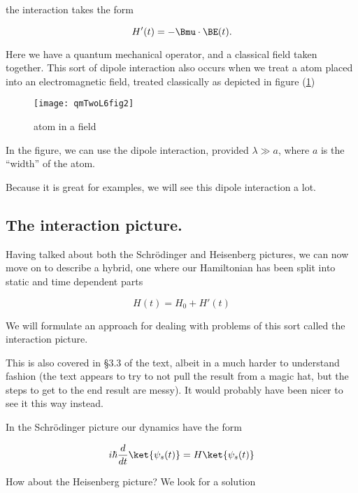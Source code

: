 the interaction takes the form

\begin{equation}\label{eqn:qmTwoL6:90}
H'(t) = -\Bmu \cdot \BE(t).
\end{equation}

Here we have a quantum mechanical operator, and a classical field taken together.  This sort of dipole interaction also occurs when we treat a atom placed into an electromagnetic field, treated classically as depicted in figure (\ref{fig:qmTwoL6fig2})

\begin{figure}[htp]
\centering
\texttt{[image: qmTwoL6fig2]}
\caption{atom in a field}\label{fig:qmTwoL6fig2}
\end{figure}

In the figure, we can use the dipole interaction, provided $\lambda \gg a$, where $a$ is the ``width'' of the atom.

Because it is great for examples, we will see this dipole interaction a lot.

\subsection{The interaction picture.}

Having talked about both the Schr\"{o}dinger and Heisenberg pictures, we can now move on to describe a hybrid, one where our Hamiltonian has been split into static and time dependent parts

\begin{equation}\label{eqn:qmTwoL6:110}
H(t) = H_0 + H'(t)
\end{equation}

We will formulate an approach for dealing with problems of this sort called the interaction picture.

This is also covered in \S 3.3 of the text, albeit in a much harder to understand fashion (the text appears to try to not pull the result from a magic hat, but the steps to get to the end result are messy).  It would probably have been nicer to see it this way instead.

In the Schr\"{o}dinger picture our dynamics have the form

\begin{equation}\label{eqn:qmTwoL6:130}
i \hbar \frac{d}{dt} \ket{\psi_s(t)} = H \ket{\psi_s(t)}
\end{equation}

How about the Heisenberg picture?  We look for a solution 

